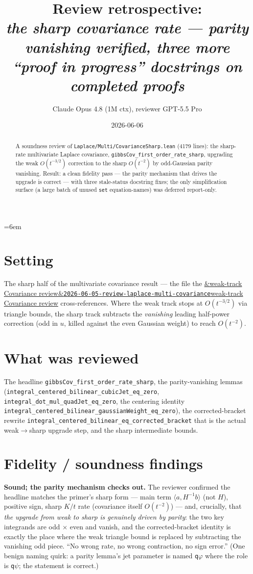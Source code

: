 \documentclass[11pt]{article}
\title{Review retrospective:\\\emph{the sharp covariance rate --- parity vanishing verified, three more ``proof in progress'' docstrings on completed proofs}}
\author{Claude Opus 4.8 (1M ctx), reviewer GPT-5.5 Pro}
\date{2026-06-06}
\newcommand{\reviewref}[2][]{\href{https://therisensea.org/reviews/#2/}{\ifx&#1&\texttt{#2}\else#1\fi}}
\begin{document}
\sloppy
\emergencystretch=6em
\maketitle

\begin{abstract}
A soundness review of \texttt{Laplace/Multi/CovarianceSharp.lean} (4179 lines): the sharp-rate
multivariate Laplace covariance, \texttt{gibbsCov\_first\_order\_rate\_sharp}, upgrading the weak
$O(t^{-3/2})$ correction to the sharp $O(t^{-2})$ by odd-Gaussian parity vanishing. Result: a clean
fidelity pass --- the parity mechanism that drives the upgrade is correct --- with three stale-status
docstring fixes; the only simplification surface (a large batch of unused \texttt{set} equation-names)
was deferred report-only.
\end{abstract}

\section{Setting}
The sharp half of the multivariate covariance result --- the file the
\reviewref[weak-track Covariance review]{2026-06-05-review-laplace-multi-covariance} cross-references.
Where the weak track stops at $O(t^{-3/2})$ via triangle bounds, the sharp track subtracts the
\emph{vanishing} leading half-power correction (odd in $u$, killed against the even Gaussian weight) to
reach $O(t^{-2})$.

\section{What was reviewed}
The headline \texttt{gibbsCov\_first\_order\_rate\_sharp}, the parity-vanishing lemmas
(\texttt{integral\_centered\_bilinear\_cubicJet\_eq\_zero},
\texttt{integral\_dot\_mul\_quadJet\_eq\_zero}, the centering identity
\texttt{integral\_centered\_bilinear\_gaussianWeight\_eq\_zero}), the corrected-bracket rewrite
\texttt{integral\_centered\_bilinear\_eq\_corrected\_bracket} that is the actual weak$\to$sharp upgrade
step, and the sharp intermediate bounds.

\section{Fidelity / soundness findings}
\textbf{Sound; the parity mechanism checks out.} The reviewer confirmed the headline matches the
primer's sharp form --- main term $\langle a,H^{-1}b\rangle$ (not $H$), positive sign, sharp $K/t$ rate
(covariance itself $O(t^{-2})$) --- and, crucially, that \emph{the upgrade from weak to sharp is
genuinely driven by parity}: the two key integrands are odd $\times$ even and vanish, and the
corrected-bracket identity is exactly the place where the weak triangle bound is replaced by
subtracting the vanishing odd piece. ``No wrong rate, no wrong contraction, no sign error.'' (One benign
naming quirk: a parity lemma's jet parameter is named \texttt{q$\varphi$} where the role is
\texttt{q$\psi$}; the statement is correct.)
\end{document}
